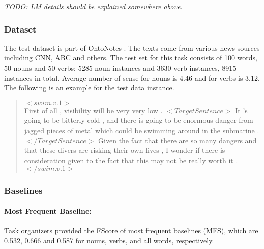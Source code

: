 
\emph{TODO: LM details should be explained somewhere above.}


\subsubsection{Dataset} 
The test dataset is part of OntoNotes \cite{hovy06ontonotes}. The texts come from various news sources including CNN, ABC and others. The test set for this task consists of 100 words, 50 nouns and 50 verbs; 5285 noun instances and 3630 verb instances, 8915 instances in total. Average number of sense for nouns is 4.46 and for verbs is 3.12. The following is an example for the test data instance.

\begin{quote}
  $<swim.v.1>$ \\
 First of all , visibility will be very very low . $<TargetSentence>$ It 
 's going to be bitterly cold , and there is going to be enormous 
 danger from jagged pieces of metal which could be swimming around in
 the submarine . $</TargetSentence>$ Given the fact that there are so many
 dangers and that these divers are risking their own lives , I wonder
 if there is consideration given to the fact that this may not be 
 really worth it . \\
 $</swim.v.1>$
\end{quote}




\subsubsection{Baselines}

\paragraph{Most Frequent Baseline:} Task organizers provided the FScore of most frequent baselines (MFS), which are 0.532, 0.666 and 0.587 for nouns, verbs, and all words, respectively.
